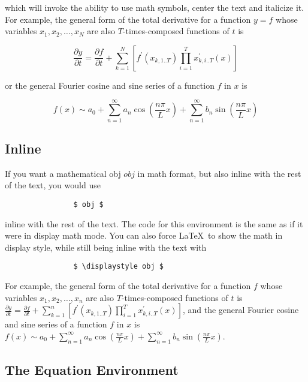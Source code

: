 \documentclass[11pt,letterpaper,twoside,titlepage]{article}
\newcommand{\latex}{\LaTeX \ }
\begin{document}
			which will invoke the ability to use math symbols, center the text and italicize it.  \\
			
			For example, the general form of the total derivative for a function $y=f$ whose variables $x_1, x_2, \dots, x_N $ are also $T$-times-composed functions of $t$ is
			
			\[ \frac{\partial y}{\partial t} = \frac{\partial f}{\partial t} + \sum_{k=1}^N \left[ f^\prime(x_{k,1..T} ) \prod_{i=1}^{T} x^\prime_{k,i..T}(x) \right] \]
			
			or the general Fourier cosine and sine series of a function $f$ in $x$ is 
			
			\[ f(x) \sim a_0 + \sum_{n=1}^\infty a_n \cos \left(\frac{n \pi}{L} x \right) + \sum_{n=1}^\infty b_n \sin \left( \frac{n \pi}{L} x \right) \]
			
		\subsection{Inline}
		
			If you want a mathematical obj $obj$ in math format, but also inline with the rest of the text, you would use
			
			\begin{verbatim}
				$ obj $
			\end{verbatim}
			
			inline with the rest of the text. The code for this environment is the same as if it were in display math mode.  You can also force \latex to show the math in display style, while still being inline with the text with 
			
			\begin{verbatim}
				$ \displaystyle obj $
			\end{verbatim}
			
			For example, the general form of the total derivative for a function $f$ whose variables $x_1, x_2, \dots, x_n $ are also $T$-times-composed functions of $t$ is $ \frac{\partial y}{\partial t} = \frac{\partial f}{\partial t} + \sum_{k=1}^n \left[ f^\prime(x_{k,1..T} ) \prod_{i=1}^{T} x^\prime_{k,i..T}(x) \right] $, and the general Fourier cosine and sine series of a function $f$ in $x$ is $ f(x) \sim a_0 + \sum_{n=1}^\infty a_n \cos \left(\frac{n \pi}{L} x \right) + \sum_{n=1}^\infty b_n \sin \left( \frac{n \pi}{L} x \right) $.
			
		\subsection{The Equation Environment}
		
\end{document}
